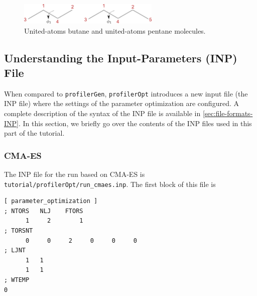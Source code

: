 \documentclass[10pt,a4paper,openany]{memoir}
\numberwithin{equation}{section}
\newcommand{\profileropt}[0]{\texttt{profilerOpt}}
\newcommand{\profilergen}[0]{\texttt{profilerGen}}
\begin{document}
\begin{figure}[tb]
  \centering
  \includegraphics[width=0.6\textwidth]{butane_pentane}
  \caption{United-atoms butane and united-atoms pentane molecules.}
  \label{fig:tutorial-butane-pentane}
\end{figure}

\subsection{Understanding the Input-Parameters (INP) File}
\label{sec:tutorial-profileropt-inp}

When compared to \profilergen{}, \profileropt{} introduces a new input
file (the INP file) where the settings of the parameter optimization
are configured.
%
A complete description of the syntax of the INP file is available in
\autoref{sec:file-formats-INP}.
%
In this section, we briefly go over the contents of the INP files used
in this part of the tutorial.

\subsubsection{CMA-ES}

The INP file for the run based on CMA-ES is \texttt{tutorial/profilerOpt/run\_cmaes.inp}.
The first block of this file is

\begin{lstlisting}[language=gromacs]
[ parameter_optimization ]
; NTORS   NLJ    FTORS
      1     2        1
; TORSNT
      0     0     2     0     0     0
; LJNT
      1   1
      1   1
; WTEMP
0
\end{lstlisting}\vspace{2ex}\par
\end{document}
